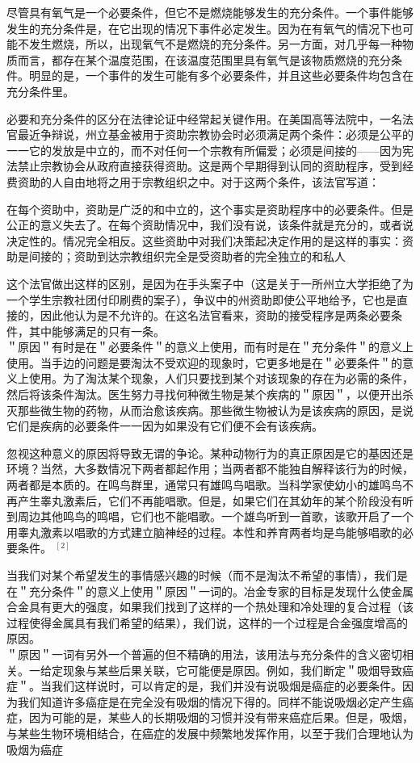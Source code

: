 尽管具有氧气是一个必要条件，但它不是燃烧能够发生的充分条件。一个事件能够发生的充分条件是，在它出现的情况下事件必定发生。因为在有氧气的情况下也可能不发生燃烧，所以，出现氧气不是燃烧的充分条件。另一方面，对几乎每一种物质而言，都存在某个温度范围，在该温度范围里具有氧气是该物质燃烧的充分条件。明显的是，一个事件的发生可能有多个必要条件，并且这些必要条件均包含在充分条件里。

必要和充分条件的区分在法律论证中经常起关键作用。在美国高等法院中，一名法官最近争辩说，州立基金被用于资助宗教协会时必须满足两个条件：必须是公平的一一它的发放是中立的，而不对任何一个宗教有所偏爱；必须是间接的——因为宪法禁止宗教协会从政府直接获得资助。这是两个早期得到认同的资助程序，受到经费资助的人自由地将之用于宗教组织之中。对于这两个条件，该法官写道：

在每个资助中，资助是广泛的和中立的，这个事实是资助程序中的必要条件。但是公正的意义失去了。在每个资助情况中，我们没有说，该条件就是充分的，或者说决定性的。情况完全相反。这些资助中对我们决策起决定作用的是这样的事实：资助是间接的；资助到达宗教组织完全是受资助者的完全独立的和私人

这个法官做出这样的区别，是因为在手头案子中（这是关于一所州立大学拒绝了为一个学生宗教社团付印刷费的案子），争议中的州资助即使公平地给予，它也是直接的，因此他认为是不允许的。在这名法官看来，资助的接受程序是两条必要条件，其中能够满足的只有一条。\\
＂原因＂有时是在＂必要条件＂的意义上使用，而有时是在＂充分条件＂的意义上使用。当手边的问题是要淘汰不受欢迎的现象时，它更多地是在＂必要条件＂的意义上使用。为了淘汰某个现象，人们只要找到某个对该现象的存在为必需的条件，然后将该条件淘汰。医生努力寻找何种微生物是某个疾病的＂原因＂，以便开出杀灭那些微生物的药物，从而治愈该疾病。那些微生物被认为是该疾病的原因，是说它们是疾病的必要条件一一因为如果没有它们便不会有该疾病。

忽视这种意义的原因将导致无谓的争论。某种动物行为的真正原因是它的基因还是环境？当然，大多数情况下两者都起作用；当两者都不能独自解释该行为的时候，两者都是本质的。在鸣鸟群里，通常只有雄鸣鸟唱歌。当科学家使幼小的雄鸣鸟不再产生睾丸激素后，它们不再能唱歌。但是，如果它们在其幼年的某个阶段没有听到周边其他鸣鸟的鸣唱，它们也不能唱歌。一个雄鸟听到一首歌，该歌开启了一个用睾丸激素以唱歌的方式建立脑神经的过程。本性和养育两者均是鸟能够唱歌的必要条件。 ${ }^{[2]}$

当我们对某个希望发生的事情感兴趣的时候（而不是淘汰不希望的事情），我们是在＂充分条件＂的意义上使用＂原因＂一词的。冶金专家的目标是发现什么使金属合金具有更大的强度，如果我们找到了这样的一个热处理和冷处理的复合过程（该过程使得金属具有我们希望的结果），我们说，这样的一个过程是合金强度增高的原因。\\
＂原因＂一词有另外一个普遍的但不精确的用法，该用法与充分条件的含义密切相关。一给定现象与某些后果关联，它可能便是原因。例如，我们断定＂吸烟导致癌症＂。当我们这样说时，可以肯定的是，我们并没有说吸烟是癌症的必要条件。因为我们知道许多癌症是在完全没有吸烟的情况下得的。同样不能说吸烟必定产生癌症，因为可能的是，某些人的长期吸烟的习惯并没有带来癌症后果。但是，吸烟，与某些生物环境相结合，在癌症的发展中频繁地发挥作用，以至于我们合理地认为吸烟为癌症

